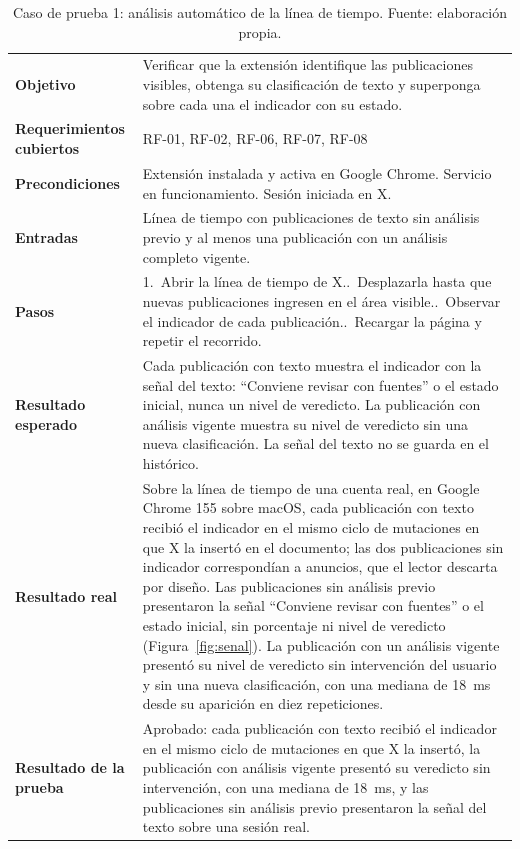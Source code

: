 \begin{small}
\begin{longtable}{@{}>{\raggedright\arraybackslash}p{3.4cm} p{11.8cm}@{}}
  \caption{Caso de prueba 1: análisis automático de la línea de tiempo. Fuente: elaboración propia.}
  \label{tab:cp-01} \\
    \hline
    \textbf{Objetivo} & Verificar que la extensión identifique las publicaciones visibles, obtenga su clasificación de texto y superponga sobre cada una el indicador con su estado. \\
    \textbf{Requerimientos cubiertos} & RF-01, RF-02, RF-06, RF-07, RF-08 \\
    \textbf{Precondiciones} & Extensión instalada y activa en Google Chrome. Servicio en funcionamiento. Sesión iniciada en X. \\
    \textbf{Entradas} & Línea de tiempo con publicaciones de texto sin análisis previo y al menos una publicación con un análisis completo vigente. \\
    \textbf{Pasos} & 1.~Abrir la línea de tiempo de X.\newline 2.~Desplazarla hasta que nuevas publicaciones ingresen en el área visible.\newline 3.~Observar el indicador de cada publicación.\newline 4.~Recargar la página y repetir el recorrido. \\
    \textbf{Resultado esperado} & Cada publicación con texto muestra el indicador con la señal del texto: \enquote{Conviene revisar con fuentes} o el estado inicial, nunca un nivel de veredicto. La publicación con análisis vigente muestra su nivel de veredicto sin una nueva clasificación. La señal del texto no se guarda en el histórico. \\
    \textbf{Resultado real} & Sobre la línea de tiempo de una cuenta real, en Google Chrome 155 sobre macOS, cada publicación con texto recibió el indicador en el mismo ciclo de mutaciones en que X la insertó en el documento; las dos publicaciones sin indicador correspondían a anuncios, que el lector descarta por diseño. Las publicaciones sin análisis previo presentaron la señal \enquote{Conviene revisar con fuentes} o el estado inicial, sin porcentaje ni nivel de veredicto (Figura~\ref{fig:senal}). La publicación con un análisis vigente presentó su nivel de veredicto sin intervención del usuario y sin una nueva clasificación, con una mediana de 18~ms desde su aparición en diez repeticiones. \\
    \textbf{Resultado de la prueba} & Aprobado: cada publicación con texto recibió el indicador en el mismo ciclo de mutaciones en que X la insertó, la publicación con análisis vigente presentó su veredicto sin intervención, con una mediana de 18~ms, y las publicaciones sin análisis previo presentaron la señal del texto sobre una sesión real. \\
    \hline
\end{longtable}
\end{small}


